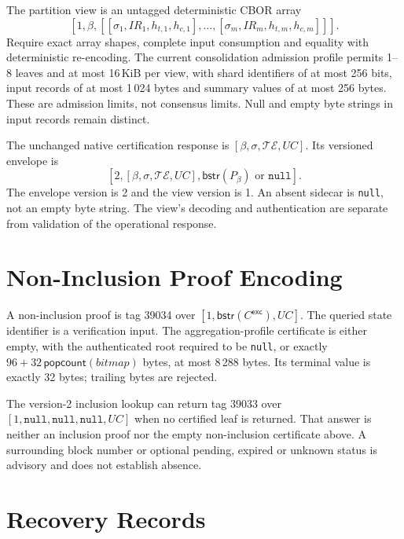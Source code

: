 The partition view is an untagged deterministic CBOR array
\[
[1,\beta,[[\sigma_1,IR_1,h_{t,1},h_{c,1}],\ldots,[\sigma_m,IR_m,h_{t,m},h_{c,m}]]].
\]
Require exact array shapes, complete input consumption and equality with deterministic re-encoding. The current consolidation admission profile permits 1--8 leaves and at most 16\,KiB per view, with shard identifiers of at most 256 bits, input records of at most 1\,024 bytes and summary values of at most 256 bytes. These are admission limits, not consensus limits. Null and empty byte strings in input records remain distinct.

The unchanged native certification response is $[\beta,\sigma,\mathcal{TE},UC]$. Its versioned envelope is
\[
[2,[\beta,\sigma,\mathcal{TE},UC],\mathsf{bstr}(P_\beta)\text{ or }\texttt{null}].
\]
The envelope version is 2 and the view version is 1. An absent sidecar is \texttt{null}, not an empty byte string. The view's decoding and authentication are separate from validation of the operational response.


\section{Non-Inclusion Proof Encoding}\label{sec:non-inclusion-encoding}

A non-inclusion proof is tag 39034 over $[1,\mathsf{bstr}(C^\mathsf{exc}),UC]$. The queried state identifier is a verification input. The aggregation-profile certificate is either empty, with the authenticated root required to be \texttt{null}, or exactly $96+32\,\mathsf{popcount}(\mathit{bitmap})$ bytes, at most 8\,288 bytes. Its terminal value is exactly 32 bytes; trailing bytes are rejected.

The version-2 inclusion lookup can return tag 39033 over $[1,\texttt{null},\texttt{null},\texttt{null},UC]$ when no certified leaf is returned. That answer is neither an inclusion proof nor the empty non-inclusion certificate above. A surrounding block number or optional pending, expired or unknown status is advisory and does not establish absence.


\section{Recovery Records}\label{sec:recovery-encoding}

